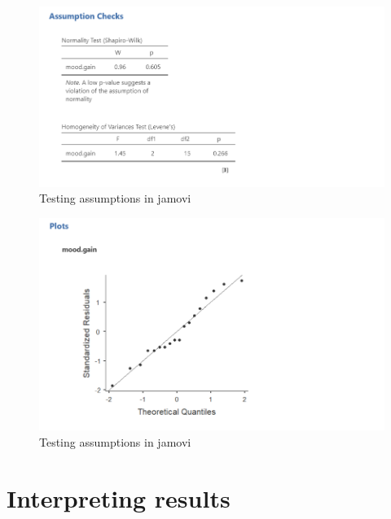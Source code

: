 \documentclass[
]{book}
\begin{document}
\begin{figure}

{\centering \includegraphics[width=1\linewidth]{images/04_one-way-anova/one-way_assumptions1} 

}

\caption{Testing assumptions in jamovi}\label{fig:unnamed-chunk-4}
\end{figure}

\begin{figure}

{\centering \includegraphics[width=1\linewidth]{images/04_one-way-anova/one-way_assumptions2} 

}

\caption{Testing assumptions in jamovi}\label{fig:unnamed-chunk-5}
\end{figure}

\hypertarget{interpreting-results-2}{%
\section{Interpreting results}\label{interpreting-results-2}}
\end{document}
